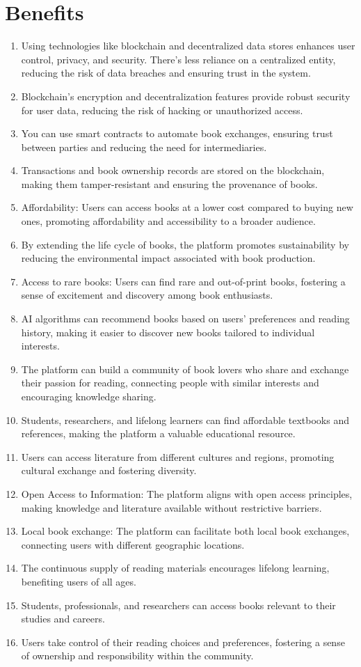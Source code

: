 \documentclass{article}
\begin{document}
\section{Benefits}
\begin{enumerate}
 \item Using technologies like blockchain and decentralized data stores enhances user control, privacy, and security. There's less reliance on a centralized entity, reducing the risk of data breaches and ensuring trust in the system.
  \item Blockchain's encryption and decentralization features provide robust security for user data, reducing the risk of hacking or unauthorized access.
  \item You can use smart contracts to automate book exchanges, ensuring trust between parties and reducing the need for intermediaries.
  \item Transactions and book ownership records are stored on the blockchain, making them tamper-resistant and ensuring the provenance of books.
  \item Affordability: Users can access books at a lower cost compared to buying new ones, promoting affordability and accessibility to a broader audience.
  \item By extending the life cycle of books, the platform promotes sustainability by reducing the environmental impact associated with book production.
  \item Access to rare books: Users can find rare and out-of-print books, fostering a sense of excitement and discovery among book enthusiasts.
  \item AI algorithms can recommend books based on users' preferences and reading history, making it easier to discover new books tailored to individual interests.
  \item The platform can build a community of book lovers who share and exchange their passion for reading, connecting people with similar interests and encouraging knowledge sharing.
  \item Students, researchers, and lifelong learners can find affordable textbooks and references, making the platform a valuable educational resource.
  \item Users can access literature from different cultures and regions, promoting cultural exchange and fostering diversity.
  \item Open Access to Information: The platform aligns with open access principles, making knowledge and literature available without restrictive barriers.
  \item Local book exchange: The platform can facilitate both local book exchanges, connecting users with different geographic locations.
  \item The continuous supply of reading materials encourages lifelong learning, benefiting users of all ages.
  \item Students, professionals, and researchers can access books relevant to their studies and careers.
  \item Users take control of their reading choices and preferences, fostering a sense of ownership and responsibility within the community.
\end{enumerate}
\end{document}
